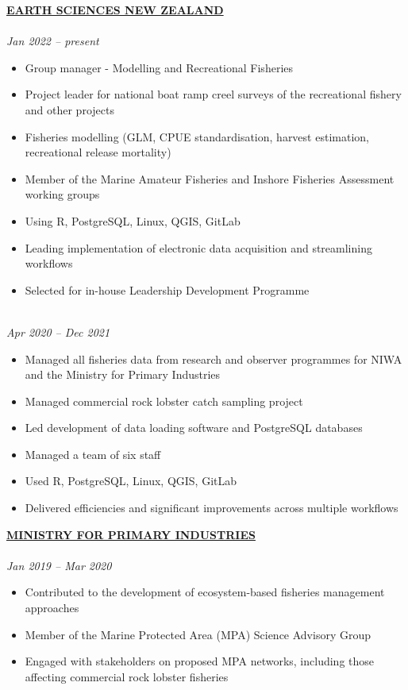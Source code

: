 \documentclass[10pt,a4paper]{article}
\begin{document}
\textbf{\href{https://earthsciences.nz/}{EARTH SCIENCES NEW ZEALAND}}  \\
 \\
\textit{Jan 2022 -- present}
\begin{itemize}[itemsep=2pt, parsep=0pt]
  \item Group manager - Modelling and Recreational Fisheries 
  \item Project leader for national boat ramp creel surveys of the recreational fishery and other projects
  \item Fisheries modelling (GLM, CPUE standardisation, harvest estimation, recreational release mortality)
  \item Member of the Marine Amateur Fisheries and Inshore Fisheries Assessment working groups
  \item Using R, PostgreSQL, Linux, QGIS, GitLab
  \item Leading implementation of electronic data acquisition and streamlining workflows
  \item Selected for in-house Leadership Development Programme
\end{itemize}



\noindent {} \\
\textit{Apr 2020 -- Dec 2021}
\begin{itemize}[itemsep=2pt, parsep=0pt]
  \item Managed all fisheries data from research and observer programmes for NIWA and the Ministry for Primary Industries
  \item Managed commercial rock lobster catch sampling project
  \item Led development of data loading software and PostgreSQL databases
  \item Managed a team of six staff
  \item Used R, PostgreSQL, Linux, QGIS, GitLab
  \item Delivered efficiencies and significant improvements across multiple workflows\\
\end{itemize}



\noindent \textbf{\href{https://www.mpi.govt.nz}{MINISTRY FOR PRIMARY INDUSTRIES}} \\
 \\
\textit{Jan 2019 -- Mar 2020}
\begin{itemize}[itemsep=2pt, parsep=0pt]
  \item Contributed to the development of ecosystem-based fisheries management approaches
  \item Member of the Marine Protected Area (MPA) Science Advisory Group
  \item Engaged with stakeholders on proposed MPA networks, including those affecting commercial rock lobster fisheries\\
\end{itemize}
\end{document}
